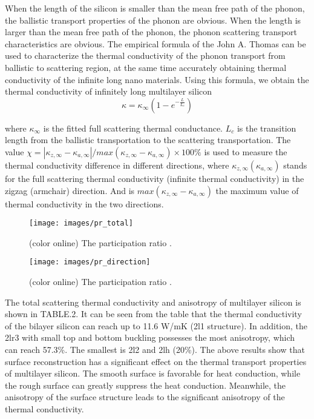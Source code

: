 \documentclass[%
 reprint,
 amsmath,amssymb,
 aps,
 prb,
]{revtex4-1}
\begin{document}
When the length of the silicon is smaller than the mean free path of the phonon, the ballistic transport properties of the phonon are obvious. When the length is larger than the mean free path of the phonon, the phonon scattering transport characteristics are obvious. The empirical formula of the John A. Thomas\cite{Thomas2010} can be used to characterize the thermal conductivity of the phonon transport from ballistic to scattering region, at the same time accurately obtaining thermal conductivity of the infinite long nano materials. Using this formula, we obtain the thermal conductivity of infinitely long multilayer silicon
\begin{equation}
\kappa = \kappa_\infty (1-e^{-\frac{L}{L_c}})
\end{equation}

where $\kappa_\infty$ is the fitted full scattering thermal conductance. $L_c$ is the transition length from the ballistic transportation to the scattering transportation. The value $ \chi=|\kappa_{z,\infty}-\kappa_{a,\infty} |/max⁡(\kappa_{z,\infty}-\kappa_{a,\infty} ) \times 100 \%$ is used to measure the thermal conductivity difference in different directions, where $ \kappa_{z,\infty} (\kappa_{a,\infty})$ stands for the full scattering thermal conductivity (infinite thermal conductivity) in the zigzag (armchair) direction. And is $ max⁡(\kappa_{z,\infty}-\kappa_{a,\infty} ) $ the maximum value of thermal conductivity in the two directions. 

\begin{figure}[b]
\texttt{[image: images/pr\_total]}
\caption{\label{fig:pr_total} (color online) The participation ratio .}
\end{figure}

\begin{figure}[b]
\texttt{[image: images/pr\_direction]}
\caption{\label{fig:pr_direction} (color online) The participation ratio .}
\end{figure}

The total scattering thermal conductivity and anisotropy of multilayer silicon is shown in TABLE.2. It can be seen from the table that the thermal conductivity of the bilayer silicon can reach up to 11.6 W/mK (2l1 structure). In addition, the 2lr3 with small top and bottom buckling possesses the most anisotropy, which can reach 57.3\%. The smallest is 2l2 and 2lh (20\%). The above results show that surface reconstruction has a significant effect on the thermal transport properties of multilayer silicon. The smooth surface is favorable for heat conduction, while the rough surface can greatly suppress the heat conduction. Meanwhile, the anisotropy of the surface structure leads to the significant anisotropy of the thermal conductivity.
\end{document}
